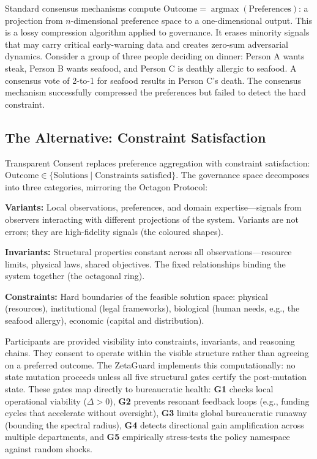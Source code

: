 \documentclass[10pt,twocolumn]{article}
\theoremstyle{definition}
\theoremstyle{remark}
\begin{document}
Standard consensus mechanisms compute $\mathrm{Outcome} = \operatorname{argmax}(\mathrm{Preferences})$: a projection from $n$-dimensional preference space to a one-dimensional output.  This is a lossy compression algorithm applied to governance.  It erases minority signals that may carry critical early-warning data and creates zero-sum adversarial dynamics.  Consider a group of three people deciding on dinner: Person A wants steak, Person B wants seafood, and Person C is deathly allergic to seafood.  A consensus vote of 2-to-1 for seafood results in Person C's death.  The consensus mechanism successfully compressed the preferences but failed to detect the hard constraint.

\subsection{The Alternative: Constraint Satisfaction}

Transparent Consent replaces preference aggregation with constraint satisfaction: $\mathrm{Outcome} \in \{\text{Solutions} \mid \text{Constraints satisfied}\}$.  The governance space decomposes into three categories, mirroring the Octagon Protocol:

\textbf{Variants:} Local observations, preferences, and domain expertise---signals from observers interacting with different projections of the system.  Variants are not errors; they are high-fidelity signals (the coloured shapes).

\textbf{Invariants:} Structural properties constant across all observations---resource limits, physical laws, shared objectives.  The fixed relationships binding the system together (the octagonal ring).

\textbf{Constraints:} Hard boundaries of the feasible solution space: physical (resources), institutional (legal frameworks), biological (human needs, e.g., the seafood allergy), economic (capital and distribution).

Participants are provided visibility into constraints, invariants, and reasoning chains.  They consent to operate within the visible structure rather than agreeing on a preferred outcome.  The ZetaGuard implements this computationally: no state mutation proceeds unless all five structural gates certify the post-mutation state.  These gates map directly to bureaucratic health: \textbf{G1} checks local operational viability ($\Delta>0$), \textbf{G2} prevents resonant feedback loops (e.g., funding cycles that accelerate without oversight), \textbf{G3} limits global bureaucratic runaway (bounding the spectral radius), \textbf{G4} detects directional gain amplification across multiple departments, and \textbf{G5} empirically stress-tests the policy namespace against random shocks.
\end{document}
